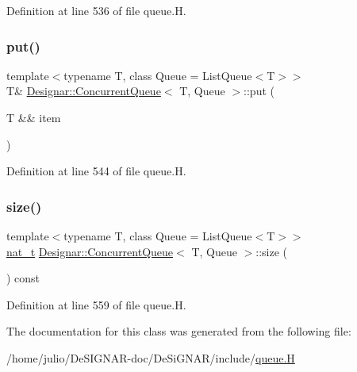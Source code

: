 Definition at line 536 of file queue.\+H.

\mbox{\label{class_designar_1_1_concurrent_queue_aacc6c771061780c42058303f300b5acb}} 
\subsubsection{\texorpdfstring{put()}{put()}\hspace{0.1cm}{\footnotesize\ttfamily [2/2]}}
{\footnotesize\ttfamily template$<$typename T, class Queue = List\+Queue$<$\+T$>$$>$ \\
T\& \hyperlink{class_designar_1_1_concurrent_queue}{Designar\+::\+Concurrent\+Queue}$<$ T, Queue $>$\+::put (\begin{DoxyParamCaption}\item[{T \&\&}]{item }\end{DoxyParamCaption})\hspace{0.3cm}{\ttfamily [inline]}}



Definition at line 544 of file queue.\+H.

\mbox{\label{class_designar_1_1_concurrent_queue_acbeaea381f53471ea17366ab7a5fc52d}} 
\subsubsection{\texorpdfstring{size()}{size()}}
{\footnotesize\ttfamily template$<$typename T, class Queue = List\+Queue$<$\+T$>$$>$ \\
\hyperlink{namespace_designar_aa72662848b9f4815e7bf31a7cf3e33d1}{nat\+\_\+t} \hyperlink{class_designar_1_1_concurrent_queue}{Designar\+::\+Concurrent\+Queue}$<$ T, Queue $>$\+::size (\begin{DoxyParamCaption}{ }\end{DoxyParamCaption}) const\hspace{0.3cm}{\ttfamily [inline]}}



Definition at line 559 of file queue.\+H.



The documentation for this class was generated from the following file\+:\begin{DoxyCompactItemize}
\item 
/home/julio/\+De\+S\+I\+G\+N\+A\+R-\/doc/\+De\+Si\+G\+N\+A\+R/include/\hyperlink{queue_8_h}{queue.\+H}\end{DoxyCompactItemize}
